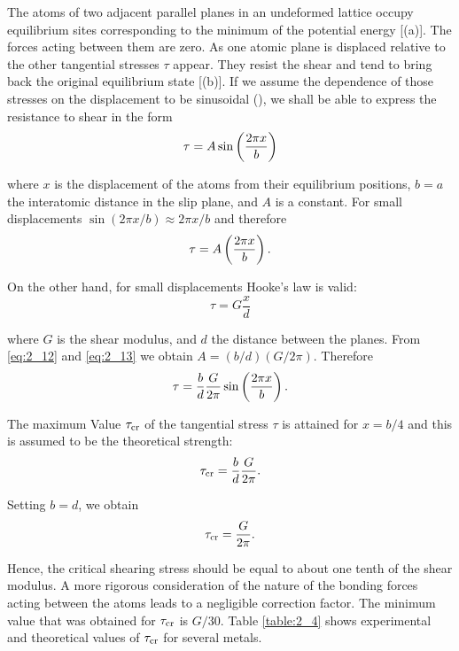 The atoms of two adjacent parallel planes in an undeformed lattice occupy equilibrium sites corresponding to the minimum of the potential energy [(a)]. The forces acting between them are zero. As one atomic plane is displaced relative to the other tangential stresses $\tau$ appear. They resist the shear and tend to bring back the original equilibrium state [(b)]. If we assume the dependence of those stresses on the displacement to be sinusoidal (), we shall be able to express the resistance to shear in the form
\begin{equation}\label{eq:2_11}
	\tau = A \sin\left(\frac{2\pi x}{b}\right)
\end{equation}

\noindent
where $x$ is the displacement of the atoms from their equilibrium positions, $b=a$ the interatomic distance in the slip plane, and $A$ is a constant. For small displacements $\sin(2\pi x/b)\approx 2\pi x/b$ and therefore
\begin{equation}\label{eq:2_12}
	\tau = A \left(\frac{2\pi x}{b}\right).
\end{equation}

On the other hand, for small displacements Hooke's law is valid:
\begin{equation}\label{eq:2_13}
	\tau = G \frac{x}{d}
\end{equation}

\noindent
where $G$ is the shear modulus, and $d$ the distance between the planes. From \eqref{eq:2_12} and \eqref{eq:2_13} we obtain $A=(b/d)(G/2\pi)$. Therefore
\begin{equation}\label{eq:2_14}
	\tau = \frac{b}{d} \frac{G}{2\pi} \sin\left(\frac{2\pi x}{b}\right).
\end{equation}

The maximum Value $\tau_{\text{cr}}$ of the tangential stress $\tau$ is attained for $x=b/4$ and this is assumed to be the theoretical strength:
\begin{equation}\label{eq:2_15}
	\tau_{\text{cr}} = \frac{b}{d} \frac{G}{2\pi}.
\end{equation}

\noindent
Setting $b=d$, we obtain
\begin{equation}\label{eq:2_16}
	\tau_{\text{cr}} = \frac{G}{2\pi}.
\end{equation}

Hence, the critical shearing stress should be equal to about one tenth of the shear modulus. A more rigorous consideration of the nature of the bonding forces acting between the atoms leads to a negligible correction factor. The minimum value that was obtained for $\tau_{\text{cr}}$ is $G/30$. Table \ref{table:2_4} shows experimental and theoretical values of $\tau_{\text{cr}}$ for several metals.

